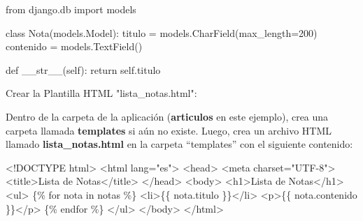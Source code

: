 \documentclass[
  a4paper,
  DIV=11,
  numbers=noendperiod,
  onepage,
  openany]{scrreprt}
\newenvironment{Shaded}{\begin{snugshade}}{\end{snugshade}}
\newcommand{\ControlFlowTok}[1]{\textcolor[rgb]{0.00,0.23,0.31}{#1}}
\newcommand{\DataTypeTok}[1]{\textcolor[rgb]{0.68,0.00,0.00}{#1}}
\newcommand{\DecValTok}[1]{\textcolor[rgb]{0.68,0.00,0.00}{#1}}
\newcommand{\FunctionTok}[1]{\textcolor[rgb]{0.28,0.35,0.67}{#1}}
\newcommand{\ImportTok}[1]{\textcolor[rgb]{0.00,0.46,0.62}{#1}}
\newcommand{\KeywordTok}[1]{\textcolor[rgb]{0.00,0.23,0.31}{#1}}
\newcommand{\NormalTok}[1]{\textcolor[rgb]{0.00,0.23,0.31}{#1}}
\newcommand{\OperatorTok}[1]{\textcolor[rgb]{0.37,0.37,0.37}{#1}}
\newcommand{\OtherTok}[1]{\textcolor[rgb]{0.00,0.23,0.31}{#1}}
\newcommand{\StringTok}[1]{\textcolor[rgb]{0.13,0.47,0.30}{#1}}
\newcommand{\VariableTok}[1]{\textcolor[rgb]{0.07,0.07,0.07}{#1}}
\begin{document}
\begin{Shaded}
\begin{Highlighting}[]
\ImportTok{from}\NormalTok{ django.db }\ImportTok{import}\NormalTok{ models}

\KeywordTok{class}\NormalTok{ Nota(models.Model):}
\NormalTok{    titulo }\OperatorTok{=}\NormalTok{ models.CharField(max\_length}\OperatorTok{=}\DecValTok{200}\NormalTok{)}
\NormalTok{    contenido }\OperatorTok{=}\NormalTok{ models.TextField()}

    \KeywordTok{def} \FunctionTok{\_\_str\_\_}\NormalTok{(}\VariableTok{self}\NormalTok{):}
        \ControlFlowTok{return} \VariableTok{self}\NormalTok{.titulo}

\NormalTok{    Crear la Plantilla HTML }\StringTok{"lista\_notas.html"}\NormalTok{:}
\end{Highlighting}
\end{Shaded}

Dentro de la carpeta de la aplicación (\textbf{articulos} en este
ejemplo), crea una carpeta llamada \textbf{templates} si aún no existe.
Luego, crea un archivo HTML llamado \textbf{lista\_notas.html} en la
carpeta ``templates'' con el siguiente contenido:

\begin{Shaded}
\begin{Highlighting}[]
\DataTypeTok{\textless{}!DOCTYPE }\NormalTok{html}\DataTypeTok{\textgreater{}}
\DataTypeTok{\textless{}}\KeywordTok{html}\OtherTok{ lang}\OperatorTok{=}\StringTok{"es"}\DataTypeTok{\textgreater{}}
\DataTypeTok{\textless{}}\KeywordTok{head}\DataTypeTok{\textgreater{}}
    \DataTypeTok{\textless{}}\KeywordTok{meta}\OtherTok{ charset}\OperatorTok{=}\StringTok{"UTF{-}8"}\DataTypeTok{\textgreater{}}
    \DataTypeTok{\textless{}}\KeywordTok{title}\DataTypeTok{\textgreater{}}\NormalTok{Lista de Notas}\DataTypeTok{\textless{}/}\KeywordTok{title}\DataTypeTok{\textgreater{}}
\DataTypeTok{\textless{}/}\KeywordTok{head}\DataTypeTok{\textgreater{}}
\DataTypeTok{\textless{}}\KeywordTok{body}\DataTypeTok{\textgreater{}}
    \DataTypeTok{\textless{}}\KeywordTok{h1}\DataTypeTok{\textgreater{}}\NormalTok{Lista de Notas}\DataTypeTok{\textless{}/}\KeywordTok{h1}\DataTypeTok{\textgreater{}}
    \DataTypeTok{\textless{}}\KeywordTok{ul}\DataTypeTok{\textgreater{}}
\NormalTok{        \{\% for nota in notas \%\}}
            \DataTypeTok{\textless{}}\KeywordTok{li}\DataTypeTok{\textgreater{}}\NormalTok{\{\{ nota.titulo \}\}}\DataTypeTok{\textless{}/}\KeywordTok{li}\DataTypeTok{\textgreater{}}
            \DataTypeTok{\textless{}}\KeywordTok{p}\DataTypeTok{\textgreater{}}\NormalTok{\{\{ nota.contenido \}\}}\DataTypeTok{\textless{}/}\KeywordTok{p}\DataTypeTok{\textgreater{}}
\NormalTok{        \{\% endfor \%\}}
    \DataTypeTok{\textless{}/}\KeywordTok{ul}\DataTypeTok{\textgreater{}}
\DataTypeTok{\textless{}/}\KeywordTok{body}\DataTypeTok{\textgreater{}}
\DataTypeTok{\textless{}/}\KeywordTok{html}\DataTypeTok{\textgreater{}}
\end{Highlighting}
\end{Shaded}
\end{document}
